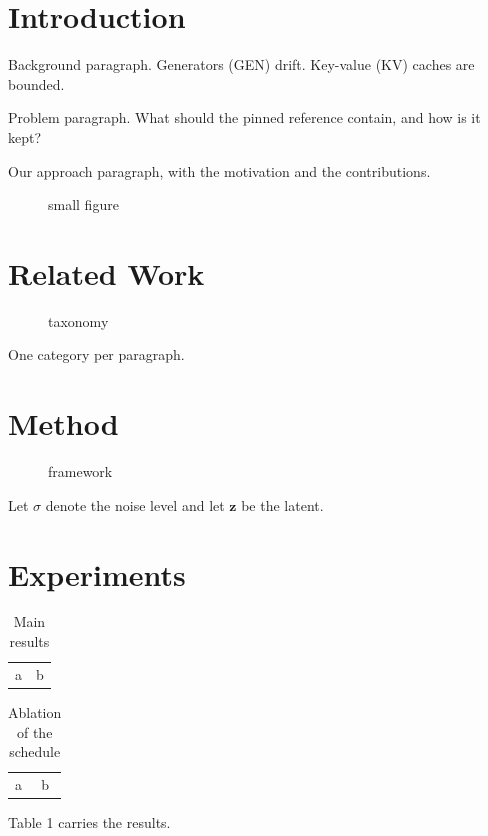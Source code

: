 \documentclass{article}
\title{\papertitle}
\begin{document}
\begin{abstract}
Streaming generators produce video chunk by chunk. Each chunk conditions on
generated content. Errors therefore accumulate. Systems pin a reference to
slow this. Keeping that reference is unsolved. Frozen references go stale and
refreshed ones inherit drift. We keep the opening latent and re-expand it on a
schedule. The method is training-free. It adds no state. On matched controls
it retains identity better than frozen and refreshed references. The gain is
confined to identity. Total benchmark score is unchanged.
\end{abstract}
\section{Introduction}\label{sec:intro}
Background paragraph. Generators (GEN) drift. Key-value (KV) caches are bounded.

Problem paragraph. What should the pinned reference contain, and how is it kept?

Our approach paragraph, with the motivation and the contributions.
\begin{figure}[t]\centering\caption{small figure}\end{figure}
\section{Related Work}\label{sec:related}
\begin{figure}[t]\centering\caption{taxonomy}\end{figure}
One category per paragraph.
\section{Method}\label{sec:method}
\begin{figure}[t]\centering\caption{framework}\end{figure}
Let $\sigma$ denote the noise level and let $\mathbf{z}$ be the latent.
\section{Experiments}\label{sec:exp}
\begin{table}[t]\caption{Main results}\begin{tabular}{ll}a&b\end{tabular}\end{table}
\begin{table}[t]\caption{Ablation of the schedule}\begin{tabular}{ll}a&b\end{tabular}\end{table}
Table 1 carries the results.
\end{document}
